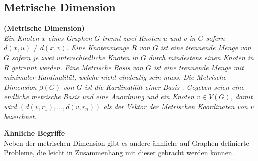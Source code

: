 \subsection{Metrische Dimension}
\label{MDT}
\begin{defi}{\textbf{(Metrische Dimension)}}\\
\emph{Ein Knoten $x$ eines Graphen $G$ trennt zwei Knoten $u$ und $v$ in $G$ sofern $d(x, u) \neq d(x, v)$. Eine Knotenmenge $R$ von $G$ ist eine \emph{trennende Menge} von $G$ sofern je zwei unterschiedliche Knoten in $G$ durch mindestens einen Knoten in $R$ getrennt werden. Eine \emph{Metrische Basis} von $G$ ist eine trennende Menge mit minimaler Kardinalität, welche nicht eindeutig sein muss. Die Metrische Dimension $\beta(G)$ von $G$ ist die Kardinalität  einer Basis \cite{zzzz}. Gegeben seien eine endliche metrische Basis und eine Anordnung  und ein Knoten $v \in V (G)$, damit wird $(d(v, r_1 ), \ldots , d(v, r_n ))$ als der Vektor der \emph{Metrischen Koordinaten} von $v$ bezeichnet.} 
\end{defi}
\begin{bsp}
\end{bsp}
\textbf{Ähnliche Begriffe}\\
Neben der metrischen Dimension gibt es andere ähnliche auf Graphen definierte Probleme, die leicht in Zusammenhang mit dieser gebracht werden können.
